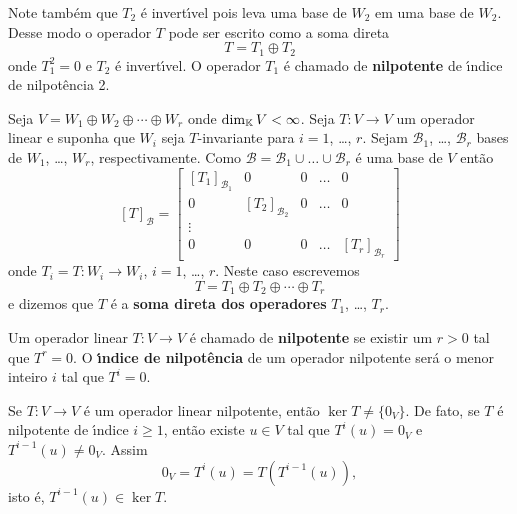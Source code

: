 Note tamb\'em que $T_2$ \'e invert{\'\i}vel pois leva uma base de $W_2$ em uma base de $W_2$. Desse modo o operador $T$ pode ser escrito como a soma direta
\[
    T = T_1 \oplus T_2
\]
onde $T_1^2 = 0$ e $T_2$ \'e invert{\'\i}vel. O operador $T_1$ \'e chamado de \textbf{nilpotente} de {\'\i}ndice de nilpot\^encia 2.

\begin{definicao}
    Seja $V = W_1 \oplus W_2 \oplus \cdots \oplus W_r$ onde $\dim_{\mathbb{K}} V < \infty$. Seja $T : V \to V$ um operador linear e suponha que $W_i$ seja $T$-invariante para $i = 1$, \dots, $r$. Sejam $\mathcal{B}_1$, \dots, $\mathcal{B}_r$ bases de $W_1$, \dots, $W_r$, respectivamente. Como $\mathcal{B} = \mathcal{B}_1 \cup \dots \cup \mathcal{B}_r $ \'e uma base de $V$ ent\~ao
    \[
        [T]_\mathcal{B} = \begin{bmatrix}
        [T_1]_{\mathcal{B}_1} & 0 & 0 & \dots & 0\\
        0 & [T_2]_{\mathcal{B}_2} & 0 & \dots & 0\\
        \vdots\\
        0 & 0 & 0 & \dots & [T_r]_{\mathcal{B}_r}
    \end{bmatrix}
    \]
    onde $T_i = T : W_i \to W_i$, $i = 1$, \dots, $r$. Neste caso escrevemos
    \[
        T = T_1 \oplus T_2 \oplus \cdots \oplus T_r
    \]
    e dizemos que $T$ \'e a \textbf{soma direta dos operadores} $T_1$, \dots, $T_r$.
\end{definicao}

\begin{definicao}
    Um operador linear $T : V \to V$ \'e chamado de \textbf{nilpotente} se existir um $r > 0$ tal que $T^r = 0$. O \textbf{{\'\i}ndice de nilpot\^encia} de um operador nilpotente ser\'a o menor inteiro $i$ tal que $T^i = 0$.
\end{definicao}

\begin{observacao}
    Se $T : V \to V$ \'e um operador linear nilpotente, ent\~ao $\ker T \ne \{0_V\}$. De fato, se $T$ \'e nilpotente de {\'\i}ndice $i \ge 1$, ent\~ao existe $u \in V$ tal que $T^i(u) = 0_V$ e $T^{i - 1}(u) \ne 0_V$. Assim
    \[
        0_V = T^i(u) = T(T^{i - 1}(u)),
    \]
    isto \'e, $T^{i - 1}(u) \in \ker T$.
\end{observacao}

